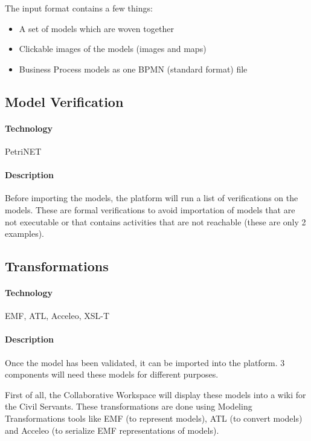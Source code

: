 \documentclass{learnpad}
\begin{document}
The input format contains a few things:
\begin{itemize}
	\item A set of models which are woven together
	\item Clickable images of the models (images and maps)
	\item Business Process models as one BPMN (standard format) file
\end{itemize}

\subsection{Model Verification}
\label{sec:model-verification}

\paragraph{Technology}
PetriNET

\paragraph{Description}
Before importing the models, the \learnpad platform will run a list of
verifications on the models.  These are formal verifications to avoid
importation of models that are not executable or that contains activities that
are not reachable (these are only 2 examples).

\subsection{Transformations}
\label{sec:transformations}

\paragraph{Technology}
EMF, ATL, Acceleo, XSL-T

\paragraph{Description}
Once the model has been validated, it can be imported into the \learnpad
platform.  3 components will need these models for different purposes.

First of all, the Collaborative Workspace will display these models into a wiki
for the Civil Servants.  These transformations are done using Modeling
Transformations tools like EMF (to represent models), ATL (to convert models)
and Acceleo (to serialize EMF representations of models).
\end{document}
